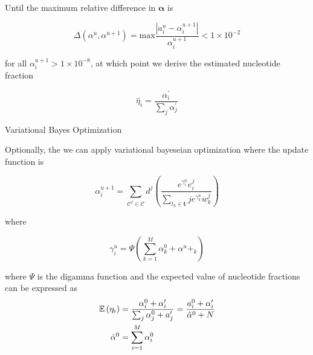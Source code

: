 Until the maximum relative difference in \( \pmb{\alpha}\) is

\[\Delta \left( \alpha^u, \alpha ^{u+1} \right) = \mathrm{max} \dfrac{\left| a_i^u  - \alpha_i ^{u+1}\right| }{ \alpha_i ^{u+1}} < 1 \times 10 ^{-2}\]

for all \(\alpha_i ^{u+1} > 1 \times 10 ^{-8}\), at which point we
derive the estimated nucleotide fraction

\[\hat \eta_i =\dfrac{\alpha_i ^{\prime} }{ \sum_j \alpha ^{\prime} _j}\]

Variational Bayes Optimization

Optionally, the we can apply variational bayeseian optimization where
the update function is

\[\alpha_i ^{u+1} = \sum^{}_{\mathcal{C}^j \in \pmb{\mathcal{C}}} d ^{j} \left( \dfrac{e ^{ \gamma ^u_i} e_i^j}{\sum^{}_{t_k \in \pmb{t}} j e ^{\gamma ^u _k}w^j_k} \right)\]

where

\[\gamma^u_i = \Psi \left( \sum^{M}_{k=1} \alpha^0_k + \alpha^u+_k \right)\]

where \(\Psi\) is the digamma function and the expected value of
nucleotide fractions can be expressed as
\[
$$
\begin{align*}
	\mathbb{E} \left( \eta_i \right) &= \dfrac{\alpha_i^0 + \alpha_i ^{\prime} }{\sum^{}_{j} \alpha^0_j + a ^{\prime} _j}= \dfrac{a_i^0 + \alpha_i ^{\prime} }{\hat \alpha^0 +N}\\
	\hat \alpha^0 &= \sum^{M}_{i = 1} \alpha_i^0
\end{align*}
$$
\]
